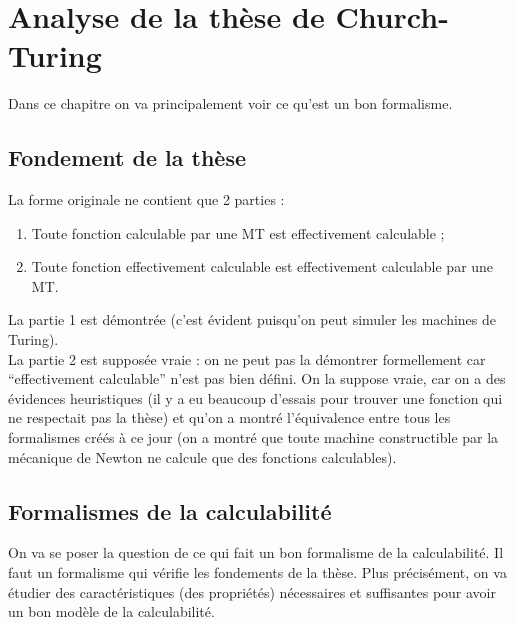 
\chapter{Analyse de la thèse de Church-Turing}
\label{sec:analyse_de_la_th_se_de_church_turing}
Dans ce chapitre on va principalement voir ce qu'est un bon formalisme.

\section{Fondement de la thèse}
\label{sub:fondement_de_la_th_se}
\begin{mythese}
La forme originale ne contient que 2 parties :
\begin{enumerate}
	\item Toute fonction calculable par une MT est effectivement calculable ;
	\item Toute fonction effectivement calculable est effectivement calculable par une MT.
\end{enumerate}
\end{mythese}

La partie 1 est démontrée (c'est évident puisqu'on peut simuler les machines de Turing).\\

La partie 2 est supposée vraie : on ne peut pas la démontrer formellement car ``effectivement calculable'' n'est pas bien défini. 
On la suppose vraie, car on a des évidences heuristiques (il y a eu beaucoup d'essais pour trouver une fonction qui ne respectait pas la thèse) et qu'on a montré l'équivalence entre tous les formalismes créés à ce jour (on a montré que toute machine constructible par la mécanique de Newton ne calcule que des fonctions calculables).

\section{Formalismes de la calculabilité}
\label{sub:formalismes_de_la_calculabilit_}

On va se poser la question de ce qui fait un bon formalisme de la
calculabilité. Il faut un formalisme qui vérifie les fondements de la
thèse. Plus précisément, on va étudier des caractéristiques (des propriétés)
nécessaires et suffisantes pour avoir un bon modèle de la calculabilité.

